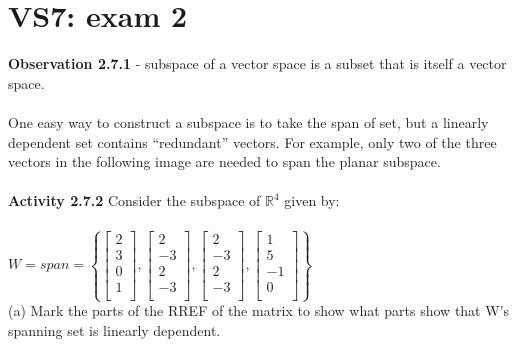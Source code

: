 \documentclass{article}
\begin{document}
{\section{VS7: exam 2}
\textbf{Observation 2.7.1} - subspace of a vector space is a subset that is itself a vector space.\\
\\
One easy way to construct a subspace is to take the span of set, but a linearly dependent set contains “redundant” vectors. For example, only two of the three vectors in the following image are needed to span the planar subspace.\\
\\
\textbf{Activity 2.7.2} Consider the subspace of $\mathbb{R}^{4}$ given by:\\
\\
$
W = span =  
\left\{ 
\begin{bmatrix} 
2\\ 3\\ 0\\ 1\\
\end{bmatrix},
\begin{bmatrix} 
2\\ -3\\ 2\\-3\\ 
\end{bmatrix},
\begin{bmatrix} 
2\\ -3\\ 2\\ -3\\
\end{bmatrix},
\begin{bmatrix} 
1\\ 5\\ -1\\ 0\\
\end{bmatrix} 
\right\}$
\\

(a) Mark the parts of the RREF of the matrix to show what parts show that W's spanning set is linearly dependent.

}
\end{document}
